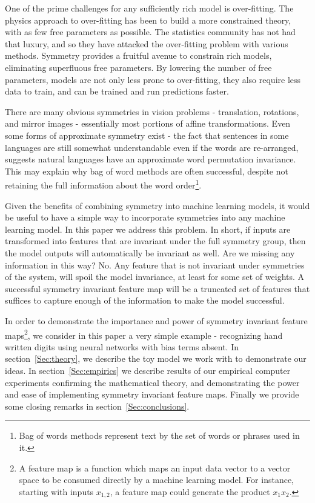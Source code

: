 \documentclass[twocolumn, prl, nofootinbib]{revtex4-1}
\begin{document}

One of the prime challenges for any sufficiently rich model is over-fitting. The physics approach to over-fitting has been to build a more constrained theory, with as few free parameters as possible. The statistics community has not had that luxury, and so they have attacked the over-fitting problem with various methods. Symmetry provides a fruitful avenue to constrain rich models, eliminating superfluous free parameters. By lowering the number of free parameters, models are not only less prone to over-fitting, they also require less data to train, and can be trained and run predictions faster.


There are many obvious symmetries in vision problems - translation, rotations, and mirror images - essentially most portions of affine transformations\cite{gens2014deep, dieleman2016exploiting, cohen2016group, henriques2016warped}. Even some forms of approximate symmetry exist\cite{kiddonsymmetry} - the fact that sentences in some languages are still somewhat understandable even if the words are re-arranged, suggests natural languages have an approximate word permutation invariance. This may explain why bag of word methods are often successful, despite not retaining the full information about the word order\footnote{Bag of words methods represent text by the set of words or phrases used in it.}. 

Given the benefits of combining symmetry into machine learning models, it would be useful to have a simple way to incorporate symmetries into any machine learning model. In this paper we address this problem. In short, if inputs are transformed into features that are invariant under the full symmetry group, then the model outputs will automatically be invariant as well. Are we missing any information in this way? No. Any feature that is not invariant under symmetries of the system, will spoil the model invariance, at least for some set of weights. A successful symmetry invariant feature map will be a truncated set of features that suffices to capture enough of the information to make the model successful.

In order to demonstrate the importance and power of symmetry invariant feature maps\footnote{A feature map is a function which maps an input data vector to a vector space to be consumed directly by a machine learning model. For instance, starting with inputs $x_{1,2}$, a feature map could generate the product $x_1 x_2$.}, we consider in this paper a very simple example - recognizing hand written digits using neural networks with bias terms absent. In section~\ref{Sec:theory}, we describe the toy model we work with to demonstrate our ideas. In section~\ref{Sec:empirics} we describe results of our empirical computer experiments confirming the mathematical theory, and demonstrating the power and ease of implementing symmetry invariant feature maps. Finally we provide some closing remarks in section~\ref{Sec:conclusions}.
\end{document}
